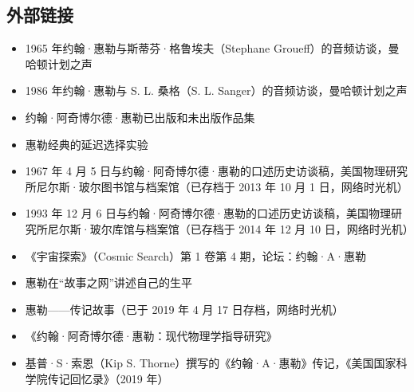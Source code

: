 \subsection{外部链接}
\begin{itemize}
\item 1965 年约翰·惠勒与斯蒂芬·格鲁埃夫（Stephane Groueff）的音频访谈，曼哈顿计划之声
\item 1986 年约翰·惠勒与 S. L. 桑格（S. L. Sanger）的音频访谈，曼哈顿计划之声
\item 约翰·阿奇博尔德·惠勒已出版和未出版作品集
\item 惠勒经典的延迟选择实验
\item 1967 年 4 月 5 日与约翰·阿奇博尔德·惠勒的口述历史访谈稿，美国物理研究所尼尔斯·玻尔图书馆与档案馆（已存档于 2013 年 10 月 1 日，网络时光机）
\item 1993 年 12 月 6 日与约翰·阿奇博尔德·惠勒的口述历史访谈稿，美国物理研究所尼尔斯·玻尔库馆与档案馆（已存档于 2014 年 12 月 10 日，网络时光机）
\item 《宇宙探索》（Cosmic Search）第 1 卷第 4 期，论坛：约翰·A·惠勒
\item 惠勒在“故事之网”讲述自己的生平
\item 惠勒——传记故事（已于 2019 年 4 月 17 日存档，网络时光机）
\item 《约翰·阿奇博尔德·惠勒：现代物理学指导研究》
\item 基普·S·索恩（Kip S. Thorne）撰写的《约翰·A·惠勒》传记，《美国国家科学院传记回忆录》（2019 年）
\end{itemize}
